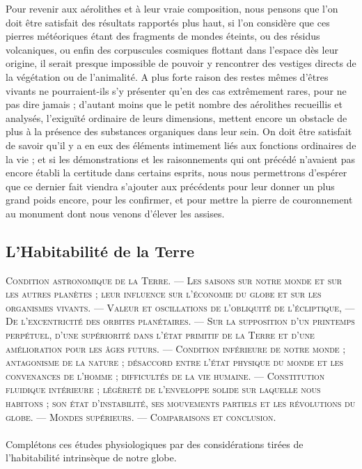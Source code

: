 \documentclass[a4paper, 11pt, oneside]{article}
\begin{document}
Pour revenir aux aérolithes et à leur vraie composition, nous pensons que l'on doit être satisfait des résultats rapportés plus haut, si l'on considère que ces pierres météoriques étant des fragments de mondes éteints, ou des résidus volcaniques, ou enfin des corpuscules cosmiques flottant dans l'espace dès leur origine, il serait presque impossible de pouvoir y rencontrer des vestiges directs de la végétation ou de l'animalité. A plus forte raison des restes mêmes d'êtres vivants ne pourraient-ils s'y présenter qu'en des cas extrêmement rares, pour ne pas dire jamais ; d'autant moins que le petit nombre des aérolithes recueillis et analysés, l'exiguïté ordinaire de leurs dimensions, mettent encore un obstacle de plus à la présence des substances organiques dans leur sein. On doit être satisfait de savoir qu'il y a en eux des éléments intimement liés aux fonctions ordinaires de la vie ; et si les démonstrations et les raisonnements qui ont précédé n'avaient pas encore établi la certitude dans certains esprits, nous nous permettrons d'espérer que ce dernier fait viendra s'ajouter aux précédents pour leur donner un plus grand poids encore, pour les confirmer, et pour mettre la pierre de couronnement au monument dont nous venons d'élever les assises.
\clearpage
\subsection{L'Habitabilité de la Terre}
\begin{center}
\scshape
\small
Condition astronomique de la Terre. --- Les saisons sur notre monde et sur les autres planètes ; leur influence sur l'économie du globe et sur les organismes vivants. --- Valeur et oscillations de l'obliquité de l'écliptique, --- De l'excentricité des orbites planétaires. --- Sur la supposition d'un printemps perpétuel, d'une supériorité dans l'état primitif de la Terre et d'une amélioration pour les âges futurs. --- Condition inférieure de notre monde ; antagonisme de la nature ; désaccord entre l'état physique du monde et les convenances de l'homme ; difficultés de la vie humaine. --- Constitution fluidique intérieure ; légèreté de l'enveloppe solide sur laquelle nous habitons ; son état d'instabilité, ses mouvements partiels et les révolutions du globe. --- Mondes supérieurs. --- Comparaisons et conclusion.
\end{center}
\paragraph{}
Complétons ces études physiologiques par des considérations tirées de l'habitabilité intrinsèque de notre globe.
\end{document}
